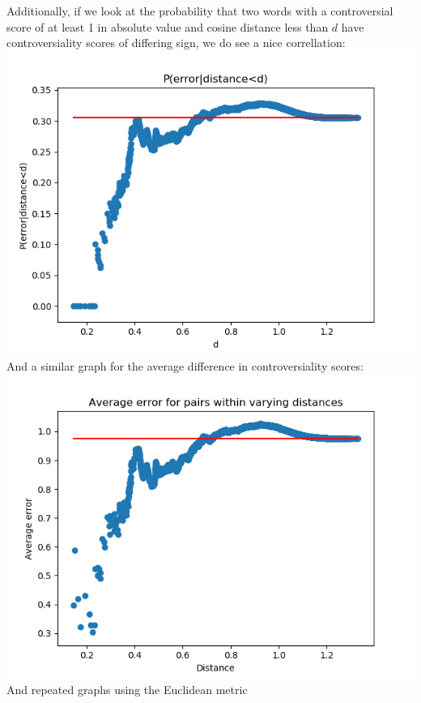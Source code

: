 \documentclass[11pt]{article} %
\begin{document}
Additionally, if we look at the probability that two words with a controversial score of at least 1 in absolute value and cosine distance less than $d$ have controversiality scores of differing sign, we do see a nice correllation:\\
\includegraphics[scale=0.5]{conditionalperror.png}\\
And a similar graph for the average difference in controversiality scores:\\
\includegraphics[scale=0.5]{conditionalavgerror.png}\\
And repeated graphs using the Euclidean metric\\
\end{document}
